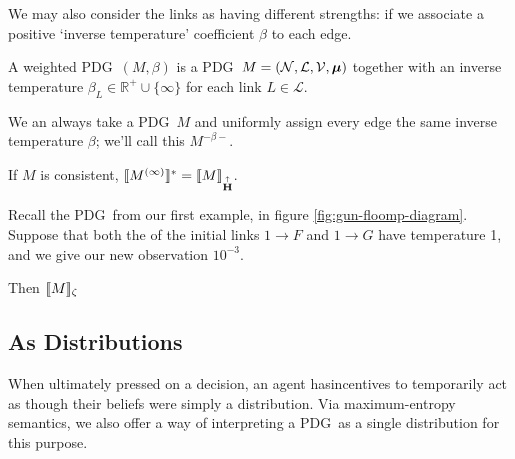 \documentclass{article}
\newcommand\MaxEnt{{\overset{\uparrow}{\mathbf H}}}
\newcommand\bmu{\boldsymbol{\mu}}
\newcommand{\MN}{PDG}
\begin{document}
	We may also consider the links as having different strengths: if we associate a positive `inverse temperature' coefficient $\beta$ to each edge.
	
	\begin{defn}
		A weighted \MN\ $(M, \beta)$ is a \MN\ $M = (\cal N, L, V, \bmu)$ together with an inverse temperature $\beta_L \in \mathbb R^+ \cup \{\infty\}$ for each link $L \in \mathcal L$.
	\end{defn}

	We an always take a \MN\ $M$ and uniformly assign every edge the same inverse temperature $\beta$; we'll call this $M^{-\beta-}$.
	
	\begin{prop}
		If $M$ is consistent, $\bbr{M^{(\infty)}}^* = \bbr{M}_\MaxEnt$.
	\end{prop}


	\begin{example}[continues=ex:guns-and-floomps]
		Recall the \MN\ from our first example, in figure \ref{fig:gun-floomp-diagram}. Suppose that both the of the initial links $1 \to F$ and $1\to G$ have temperature 1, and we give our new observation $10^{-3}$.
		
		Then $\llbracket M\rrbracket_\zeta$
		\todo{}
	\end{example}	
	
	
	
	
	\subsection{As Distributions}
	
	
	When ultimately pressed on a decision, an agent hasincentives to temporarily act as though their beliefs were simply a distribution. Via maximum-entropy semantics, we also offer a way of interpreting a \MN\ as a single distribution for this purpose. 
	
\end{document}
